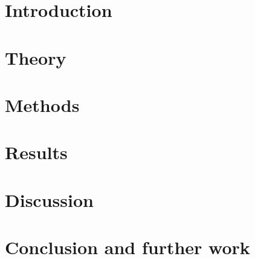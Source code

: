 \documentclass[a4paper, 12pt, openany]{book} %
\begin{document}

\pagestyle{fancy} %
\fancyhf{} %
\renewcommand{\headrulewidth}{0pt} %
\fancyhead[LE, RO]{\thepage} %
\fancyhead[RE, LO]{\leftmark} %
\setlength{\headheight}{14.49998pt} %



\chapter{Introduction}

\cleardoublepage


\chapter{Theory}

\cleardoublepage


\chapter{Methods}

\cleardoublepage


\chapter{Results}

\cleardoublepage


\chapter{Discussion}

\cleardoublepage


\chapter{Conclusion and further work}

\cleardoublepage
\end{document}
